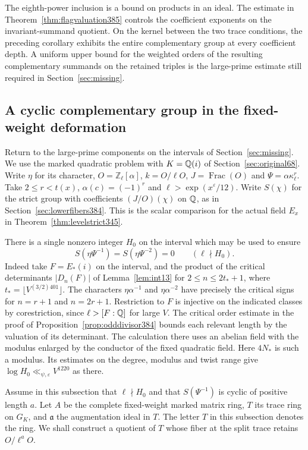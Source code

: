 \documentclass[a4paper,11pt]{article}
\theoremstyle{definition}
\theoremstyle{remark}
\newcommand{\ZZ}{\mathbb Z}\newcommand{\ord}{\operatorname{ord}}
\numberwithin{equation}{section}
\begin{document}
The eighth-power inclusion is a bound on products in an ideal.
The estimate in Theorem~\ref{thm:flagvaluation385} controls
the coefficient exponents on the invariant-summand quotient.
On the kernel between the two trace conditions, the preceding
corollary exhibits the entire complementary group at every
coefficient depth. A uniform upper bound for the weighted
orders of the resulting complementary summands on the retained
triples is the large-prime estimate still required in
Section~\ref{sec:missing}.


\subsection{A cyclic complementary group in the fixed-weight deformation}
\label{sec:cyclicstrict397}

Return to the large-prime components on the intervals of
Section~\ref{sec:missing}. We use the marked quadratic
problem with \(K=\mathbb Q(i)\) of Section~\ref{sec:original68}.
Write \(\eta\) for its character, \(O=\ZZ_\ell[\alpha]\),
\(k=O/\ell O\), \(J=\operatorname{Frac}(O)\) and
\(\Psi=\alpha\kappa_\ell^r\). Take \(2\le r<t(x)\),
\(\alpha(c)=(-1)^r\) and \(\ell>\exp(x^\varepsilon/12)\).
Write \(S(\chi)\) for the strict group with coefficients
\((J/O)(\chi)\) on \(\mathbb Q\), as in Section~\ref{sec:lowerfibers384}.
This is the scalar comparison for the actual field \(E_x\)
in Theorem~\ref{thm:levelstrict345}.

There is a single nonzero integer \(H_0\) on the interval which
may be used to ensure
\[
      S(\eta\Psi^{-1})=S(\eta\Psi^{-2})=0
                           \qquad(\ell\nmid H_0).
\]
Indeed take \(F=E_*(i)\) on the interval, and the product of the
critical determinants \( |D_n(F)|\) of
Lemma~\ref{lem:int13} for \(2\le n\le 2t_*+1\), where
\(t_*=\lfloor V^{(3/2)401}\rfloor\). The characters
\(\eta\alpha^{-1}\) and \(\eta\alpha^{-2}\) have precisely
the critical signs for \(n=r+1\) and \(n=2r+1\).
Restriction to \(F\) is injective on the indicated classes
by corestriction, since \(\ell>[F:\mathbb Q]\) for large \(V\).
The critical order estimate in the proof of
Proposition~\ref{prop:odddivisor384} bounds each relevant
length by the valuation of its determinant. The calculation
there uses an abelian field with the modulus enlarged by the
conductor of the fixed quadratic field. Here \(4N_*\) is such
a modulus. Its estimates on the degree, modulus and twist
range give \(\log H_0\ll_{\psi,\varepsilon} V^{1220}\) as there.

Assume in this subsection that \(\ell\nmid H_0\) and that
\(S(\Psi^{-1})\) is cyclic of positive length \(a\).
Let \(A\) be the complete fixed-weight marked matrix ring,
\(T\) its trace ring on \(G_K\), and \(\mathfrak a\) the
augmentation ideal in \(T\). The letter \(T\) in this
subsection denotes the ring. We shall construct a quotient
of \(T\) whose fiber at the split trace retains \(O/\ell^a O\).
\end{document}

